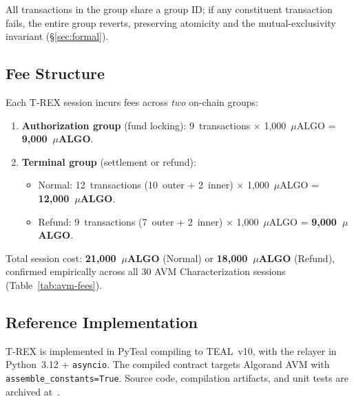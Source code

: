 \documentclass[journal]{IEEEtran}
\begin{document}
\noindent All transactions in the group share a group ID; if any
constituent transaction fails, the entire group reverts, preserving
atomicity and the mutual-exclusivity invariant
(\S\ref{sec:formal}).

\subsection{Fee Structure}

Each T-REX session incurs fees across \emph{two} on-chain groups:

\begin{enumerate}[leftmargin=*]
\item \textbf{Authorization group} (fund locking): 9~transactions
$\times$ 1{,}000~$\mu$ALGO = \textbf{9{,}000~$\mu$ALGO}.
\item \textbf{Terminal group} (settlement or refund):
\begin{itemize}
\item Normal: 12~transactions (10~outer + 2~inner)
$\times$ 1{,}000~$\mu$ALGO = \textbf{12{,}000~$\mu$ALGO}.
\item Refund: 9~transactions (7~outer + 2~inner)
$\times$ 1{,}000~$\mu$ALGO = \textbf{9{,}000~$\mu$ALGO}.
\end{itemize}
\end{enumerate}

\noindent Total session cost: \textbf{21{,}000~$\mu$ALGO} (Normal)
or \textbf{18{,}000~$\mu$ALGO} (Refund), confirmed empirically
across all 30 AVM Characterization sessions
(Table~\ref{tab:avm-fees}).

\begin{table}[h]
\centering
\caption{Fee breakdown by session type}
\label{tab:avm-fees}
\end{table}

\subsection{Reference Implementation}
T-REX is implemented in PyTeal compiling to TEAL~v10, with the
relayer in Python~3.12 + \texttt{asyncio}.
The compiled contract targets Algorand AVM with
\texttt{assemble\_constants=True}.
Source code, compilation artifacts, and unit tests are archived
at~\cite{artifact}.
\end{document}
